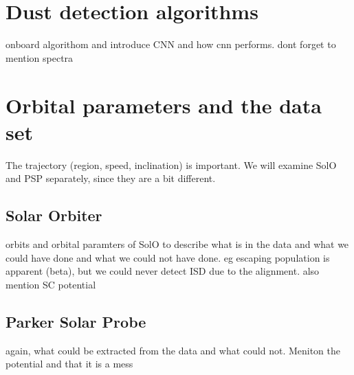 \section{Dust detection algorithms}

onboard algorithom and introduce CNN and how cnn performs. dont forget to mention spectra

\section{Orbital parameters and the data set}

The trajectory (region, speed, inclination) is important. We will examine SolO and PSP separately, since they are a bit different.

\subsection{Solar Orbiter}

orbits and orbital paramters of SolO to describe what is in the data and what we could have done and what we could not have done. eg escaping population is apparent (beta), but we could never detect ISD due to the alignment. also mention SC potential

\subsection{Parker Solar Probe}

again, what could be extracted from the data and what could not. Meniton the potential and that it is a mess












